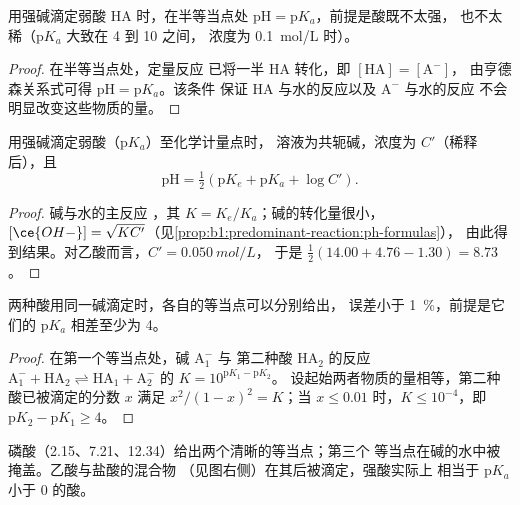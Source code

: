 \begin{proposition}[弱酸的半等当点]\label{prop:b1:titration-methods:half-equivalence}
用强碱滴定弱酸 HA 时，在半等当点处
$\mathrm{pH} = \mathrm{p}K_a$，前提是酸既不太强，
也不太稀（$\mathrm{p}K_a$ 大致在 4 到 10 之间，
浓度为 \qty{0.1}{mol/L} 时）。
\end{proposition}

\begin{proof}
在半等当点处，定量反应 
已将一半 HA 转化，即 $[\mathrm{HA}] = [\mathrm{A^-}]$，
由亨德森关系式可得 $\mathrm{pH} = \mathrm{p}K_a$。该条件
保证 HA 与水的反应以及 $\mathrm{A^-}$ 与水的反应
不会明显改变这些物质的量。
\end{proof}

\begin{proposition}[弱酸化学计量点处的 pH]\label{prop:b1:titration-methods:ph-at-equivalence}
用强碱滴定弱酸（$\mathrm{p}K_a$）至化学计量点时，
溶液为共轭碱，浓度为 $C'$（稀释后），且
\[
  \mathrm{pH} = \tfrac12(\mathrm{p}K_e + \mathrm{p}K_a + \log C') .
\]
\end{proposition}

\begin{proof}
碱与水的主反应
，其 $K = K_e/K_a$；碱的转化量很小，
$[\ce{OH-}] = \sqrt{KC'}$（见\cref{prop:b1:predominant-reaction:ph-formulas}），
由此得到结果。对乙酸而言，$C' = \qty{0.050}{mol/L}$，
于是 $\frac12(14.00 + 4.76 - 1.30) = 8.73$。
\end{proof}

\begin{proposition}[连续滴定]\label{prop:b1:titration-methods:successive}
两种酸用同一碱滴定时，各自的等当点可以分别给出，
误差小于 \qty{1}{\percent}，前提是它们的 $\mathrm{p}K_a$ 相差至少为 4。
\end{proposition}

\begin{proof}
在第一个等当点处，碱 $\mathrm{A_1^-}$ 与
第二种酸 $\mathrm{HA_2}$ 的反应 $\mathrm{A_1^-} + \mathrm{HA_2}
\rightleftharpoons \mathrm{HA_1} + \mathrm{A_2^-}$ 的 $K = 10^{\mathrm{p}K_1 - \mathrm{p}K_2}$。
设起始两者物质的量相等，第二种酸已被滴定的分数 $x$
满足 $x^2/(1 - x)^2 = K$；当 $x \leqslant 0.01$ 时，$K
\leqslant 10^{-4}$，即 $\mathrm{p}K_2 - \mathrm{p}K_1 \geqslant 4$。
\end{proof}

磷酸（2.15、7.21、12.34）给出两个清晰的等当点；第三个
等当点在碱的水中被掩盖。乙酸与盐酸的混合物
（见图右侧）在其后被滴定，强酸实际上
相当于 $\mathrm{p}K_a$ 小于 0 的酸。

